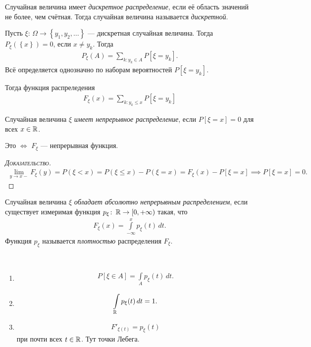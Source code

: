 \begin{df}[%
]
 Случайная величина имеет \textit{дискретное распределение}, если её область значений не более, чем счётная. Тогда случайная величина называется \textit{дискретной}.
\end{df}
\begin{prop*}
 Пусть $\xi \colon\, \Omega \to \left\{ y_1, y_2, \ldots \right\}$ --- дискретная случайная величина. Тогда $P_{\xi}(\left\{ x \right\}) = 0$, если $x \neq y_k$. Тогда
 \begin{align*}
  P_{\xi}(A) = \sum_{k : y_k \in A}  P[\xi = y_k]
 .\end{align*} Всё определяется однозначно по наборам вероятностей $P[\xi = y_k]$.

 Тогда функция распреледения
 \begin{align*}
  F_{\xi}(x) = \sum_{k : y_k \leqslant x} P[\xi = y_k]
 \end{align*} 
\end{prop*}

\begin{df}
 Случайная величина $\xi$ \textit{имеет непрерывное распределение}, если $P[\xi = x] = 0$ для всех $x \in \mathbb{R}$.
\end{df}

\begin{remrk}
 Это $\iff$ $F_{\xi}$ --- непрерывная функция.
\end{remrk}
\begin{proof}[\normalfont\textsc{Доказательство}]
 \begin{align*}
  \lim_{y \to x-} F_{\xi}(y) = P(\xi < x) = P(\xi \leqslant x) - P(\xi = x) = F_{\xi}(x) - P[\xi = x] \implies P[\xi = x] = 0.
 \end{align*} 
\end{proof}

\begin{df}
 Случайная величина $\xi$ \textit{обладает абсолютно непрерывным распределением}, если существует измеримая функция $p_{\xi} \colon\, \mathbb{R} \to [0, +\infty)$  такая, что
 \begin{align*}
  F_{\xi}(x) = \int\limits_{-\infty}^{x} p_{\xi}(t)\,dt
 .\end{align*} Функция $p_{\xi}$ называется \textit{плотностью} распределения $F_{\xi}$.
\end{df}
\begin{prop}\
 \begin{enumerate}
  \item \begin{align*}
    P[\xi \in A] = \int\limits_{A} p_{\xi} (t) \, dt.
  \end{align*} 
 \item 
  \begin{align*}
   \int\limits_{\mathbb{R}}  p_{\xi}(t) \, dt = 1.
  \end{align*} 
 \item
  \begin{align*}
   F'_{\xi(t)} = p_{\xi}(t)
  \end{align*} при почти всех $t \in \mathbb{R}$. Тут точки Лебега.
 \end{enumerate}
\end{prop}

